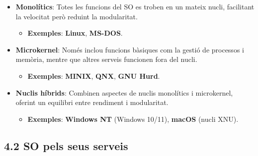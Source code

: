 \documentclass[
  a4paper,
]{article}
\providecommand{\tightlist}{%
  \setlength{\itemsep}{0pt}\setlength{\parskip}{0pt}}
\begin{document}
\begin{itemize}
\tightlist
\item
  \textbf{Monolítics}: Totes les funcions del SO es troben en un mateix
  nucli, facilitant la velocitat però reduint la modularitat.

  \begin{itemize}
  \tightlist
  \item
    \textbf{Exemples}: \textbf{Linux}, \textbf{MS-DOS}.
  \end{itemize}
\item
  \textbf{Microkernel}: Només inclou funcions bàsiques com la gestió de
  processos i memòria, mentre que altres serveis funcionen fora del
  nucli.

  \begin{itemize}
  \tightlist
  \item
    \textbf{Exemples}: \textbf{MINIX}, \textbf{QNX}, \textbf{GNU Hurd}.
  \end{itemize}
\item
  \textbf{Nuclis híbrids}: Combinen aspectes de nuclis monolítics i
  microkernel, oferint un equilibri entre rendiment i modularitat.

  \begin{itemize}
  \tightlist
  \item
    \textbf{Exemples}: \textbf{Windows NT} (Windows 10/11),
    \textbf{macOS} (nucli XNU).
  \end{itemize}
\end{itemize}

\subsection{4.2 SO pels seus serveis}\label{so-pels-seus-serveis}
\end{document}
